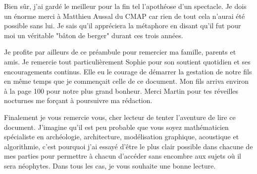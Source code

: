 Bien sûr, j'ai gardé le meilleur pour la fin tel l'apothéose d'un spectacle. Je dois un énorme merci à Matthieu Aussal du CMAP car rien de tout cela n'aurai été possible sans lui. Je sais qu'il appréciera la métaphore en disant qu'il fut pour moi un véritable "bâton de berger" durant ces trois années.

Je profite par ailleurs de ce préambule pour remercier ma famille, parents et amis. Je remercie tout particulièrement Sophie pour son soutient quotidien et ses encouragements continus. Elle eu le courage de démarrer la gestation de notre fils en même temps que je commençait celle de ce document. Mon fils arriva environ à la page 100 pour notre plus grand bonheur. Merci Martin pour tes réveilles nocturnes me forçant à poursuivre ma rédaction.

Finalement je vous remercie vous, cher lecteur de tenter l'aventure de lire ce document. J'imagine qu'il est peu probable que vous soyez mathématicien spécialiste en archéologie, architecture, modélisation graphique, acoustique et algorithmie, c'est pourquoi j'ai essayé d'être le plus clair possible dans chacune de mes parties pour permettre à chacun d'accéder sans encombre aux sujets où il sera néophytes. Dans tous les cas, je vous souhaite une bonne lecture.

